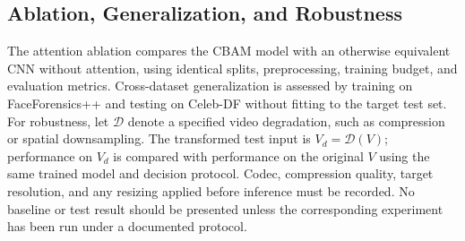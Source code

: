 \subsection{Ablation, Generalization, and Robustness}
The attention ablation compares the CBAM model with an otherwise equivalent CNN without attention, using identical splits, preprocessing, training budget, and evaluation metrics. Cross-dataset generalization is assessed by training on FaceForensics++ and testing on Celeb-DF without fitting to the target test set. For robustness, let $\mathcal{D}$ denote a specified video degradation, such as compression or spatial downsampling. The transformed test input is $V_{d}=\mathcal{D}(V)$; performance on $V_d$ is compared with performance on the original $V$ using the same trained model and decision protocol. Codec, compression quality, target resolution, and any resizing applied before inference must be recorded. No baseline or test result should be presented unless the corresponding experiment has been run under a documented protocol.
